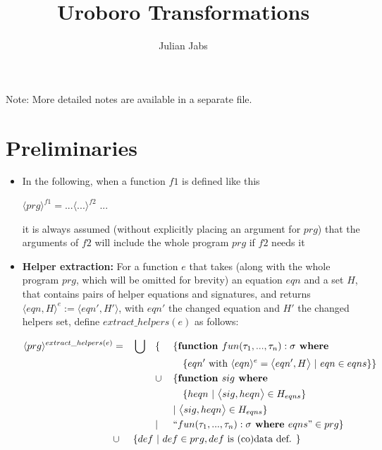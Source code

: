 \documentclass[11pt]{article} %
\title{Uroboro Transformations}
\author{Julian Jabs}
\begin{document}
\maketitle

Note: More detailed notes are available in a separate file.


\section{Preliminaries}

\begin{itemize}

\item In the following, when a function $f1$ is defined like this

$\langle prg \rangle^{f1} = ... \langle ... \rangle^{f2}$ ...

it is always assumed (without explicitly placing an argument for $prg$) that the arguments of $f2$ will include the whole program $prg$ if $f2$ needs it

\item \textbf{Helper extraction:} For a function $e$ that takes (along with the whole program $prg$, which will be omitted for brevity) an equation $eqn$ and a set $H$, that contains pairs of helper equations and signatures, and returns $\langle eqn, H \rangle^e := \big\langle eqn', H' \big\rangle$, with $eqn'$ the changed equation and $H'$ the changed helpers set, define $extract\_helpers(e)$ as follows:

\begin{alignat*}{4}
\langle prg \rangle^{extract\_helpers(e)} & = &&\bigcup &&\{ ~&&\{ \textrm{\textbf{function }} fun(\tau_1, ..., \tau_n): \sigma \textrm{\textbf{ where }} \\
& && && &&\quad \{ eqn' \textrm{ with } \langle eqn \rangle^{e} = \big\langle eqn', H \big\rangle ~ | ~ eqn \in eqns \} \} \\
& && && \cup && \{ \textrm{\textbf{function }} sig \textrm{\textbf{ where }} \\
& && && &&\quad \{ heqn ~ | ~ \big\langle sig, heqn \big\rangle \in H_{eqns} \} \\
& && && && | ~  \big\langle sig, heqn \big\rangle \in H_{eqns} \} \\
& && && | && `` fun (\tau_1, ..., \tau_n): \sigma \textrm{\textbf{ where }} eqns " \in prg \} \\
& \cup && \{ def ~ | ~ def \in prg, def \textrm{ is (co)data def. } \} \span\span\span\span
\end{alignat*}


\end{itemize}
\end{document}

